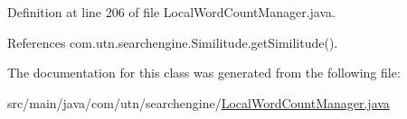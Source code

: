 \-Definition at line 206 of file \-Local\-Word\-Count\-Manager.\-java.



\-References com.\-utn.\-searchengine.\-Similitude.\-get\-Similitude().



\-The documentation for this class was generated from the following file\-:\begin{DoxyCompactItemize}
\item 
src/main/java/com/utn/searchengine/\hyperlink{_local_word_count_manager_8java}{\-Local\-Word\-Count\-Manager.\-java}\end{DoxyCompactItemize}
